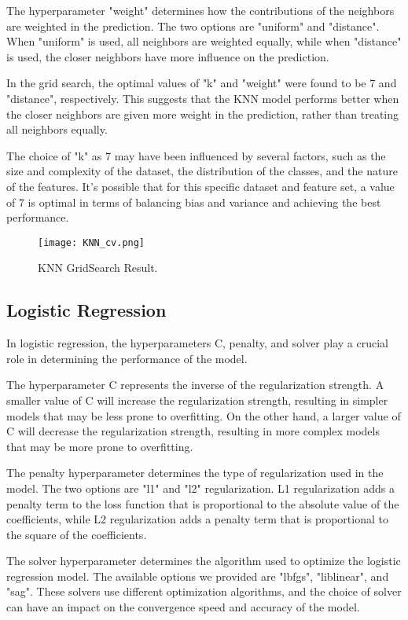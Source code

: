 \documentclass{article}
\begin{document}
The hyperparameter "weight" determines how the contributions of the neighbors are weighted in the prediction. The two options are "uniform" and "distance". When "uniform" is used, all neighbors are weighted equally, while when "distance" is used, the closer neighbors have more influence on the prediction.

In the grid search, the optimal values of "k" and "weight" were found to be 7 and "distance", respectively. This suggests that the KNN model performs better when the closer neighbors are given more weight in the prediction, rather than treating all neighbors equally.

The choice of "k" as 7 may have been influenced by several factors, such as the size and complexity of the dataset, the distribution of the classes, and the nature of the features. It's possible that for this specific dataset and feature set, a value of 7 is optimal in terms of balancing bias and variance and achieving the best performance.

\begin{figure}[h]
  \centering
  \texttt{[image: KNN\_cv.png]}
  \caption{KNN GridSearch Result.}
\end{figure}

\subsection{Logistic Regression}

In logistic regression, the hyperparameters C, penalty, and solver play a crucial role in determining the performance of the model.

The hyperparameter C represents the inverse of the regularization strength. A smaller value of C will increase the regularization strength, resulting in simpler models that may be less prone to overfitting. On the other hand, a larger value of C will decrease the regularization strength, resulting in more complex models that may be more prone to overfitting.

The penalty hyperparameter determines the type of regularization used in the model. The two options are "l1" and "l2" regularization. L1 regularization adds a penalty term to the loss function that is proportional to the absolute value of the coefficients, while L2 regularization adds a penalty term that is proportional to the square of the coefficients.

The solver hyperparameter determines the algorithm used to optimize the logistic regression model. The available options we provided are "lbfgs", "liblinear", and "sag". These solvers use different optimization algorithms, and the choice of solver can have an impact on the convergence speed and accuracy of the model.
\end{document}
